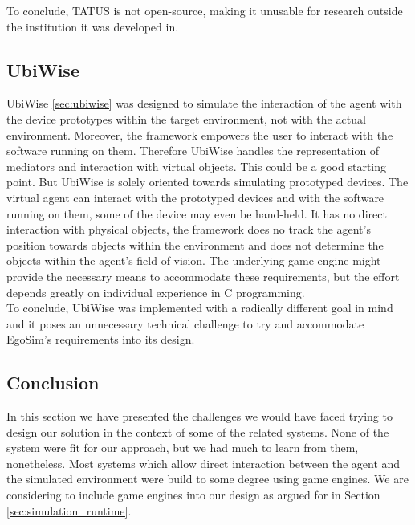 To conclude, TATUS is not open-source, making it unusable for research outside the institution it was developed in.\\

\subsection{UbiWise}\label{subsec:design_ubiwise}
UbiWise \ref{sec:ubiwise} was designed to simulate the interaction of the agent with the device prototypes within the target environment, not with the actual environment. Moreover, the framework empowers the user to interact with the software running on them. Therefore UbiWise handles the representation of mediators and interaction with virtual objects. This could be a good starting point. But UbiWise is solely oriented towards simulating prototyped devices. The virtual agent can interact with the prototyped devices and with the software running on them, some of the device may even be hand-held. It has no direct interaction with physical objects, the framework does no track the agent's position towards objects within the environment and does not determine the objects within the agent's field of vision. The underlying game engine might provide the necessary means to accommodate these requirements, but the effort depends greatly on individual experience in C programming.\\

To conclude, UbiWise was implemented with a radically different goal in mind and it poses an unnecessary technical challenge to try and accommodate EgoSim's requirements into its design.\\

\subsection{Conclusion}\label{subsec:reusing_conclusion}
In this section we have presented the challenges we would have faced trying to design our solution in the context of some of the related systems. None of the system were fit for our approach, but we had much to learn from them, nonetheless. Most systems which allow direct interaction between the agent and the simulated environment were build to some degree using game engines. We are considering to include game engines into our design as argued for in Section \ref{sec:simulation_runtime}.

